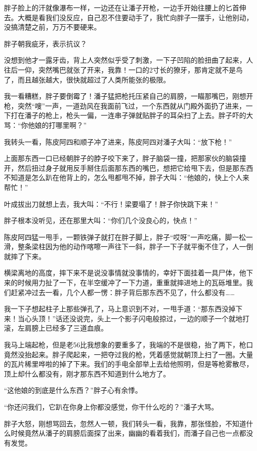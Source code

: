 胖子脸上的汗就像瀑布一样，一边还在让潘子开枪，一边手开始往腰上的匕首伸去。大概是看我们没反应，自己忍不住要动手了，我忙向胖子一摆手，让他别动，没搞清楚之前，万万不要硬来。

胖子朝我疵牙，表示抗议？

没想到他才一露牙齿，背上人突然似乎受了刺激，一下子凹陷的脸扭曲了起来，人往后一仰，突然嘴巴就张了开来，我靠！一口的2寸长的獠牙，那肯定就不是鸟了，而且越张越大，很快就超过了人类所能张的极限。

我一看糟糕，胖子要倒霉了！潘子猛把枪托压紧自己的肩膀，一瞄那嘴巴，刚想开枪，突然“嗖”一声，一道劲风在我面前飞过，一个东西就从门殿外面扔了进来，一下打在潘子的枪上，枪头一偏，一连串子弹就贴胖子的耳朵扫了上去。胖子吓的大骂：“你他娘的打哪里啊？”

我转头一看，陈皮阿四和顺子冲了进来，陈皮阿四对潘子大叫：“放下枪！”

上面那东西一口已经朝胖子的脖子咬下来了，胖子脑袋一撞，把那家伙的脑袋撞开，然后扭过身子就用反手掰住后面那东西的嘴巴，想把它给甩下去，但是那东西不知道是怎么趴在他背上的，怎么甩都甩不掉，胖子大叫：“他娘的，快上个人来帮忙！”

叶成拔出刀就想上去，我大叫：“不行！梁要塌了！胖子你快跳下来！”

胖子根本没听见，还在那里大叫：“你们几个没良心的，快点！”

陈皮阿四猛一甩手，一颗铁弹子就打在胖子脚上，胖子“哎呀”一声吃痛，脚一松一滑，整条梁柱因为他的动作喀嚓一声往下一斜，胖子一下子就平衡不住了，人一倒就摔了下来。

横梁离地的高度，摔下来不是说没事情就没事情的，幸好下面挂着一具尸体，他下来的时候用力扯了一下，在半空缓冲了一下力道，重重就摔进地上的瓦砾堆里。我们赶紧冲过去一看，几个人都一愣：胖子背后那东西不见了，什么都没有……

我一下子想起柱子上那些弹孔了，马上意识到不对，一甩手道：“那东西没掉下来！当心头顶！”话还没说完，头上一个影子闪电般掠过，一边的顺子一个就地打滚，左肩膀上已经多了三道血痕。

我马上端起枪，但是老56比我想象的要重多了，我端的不是很稳，抬了两下，枪口竟然没抬起来。胖子爬起来，一把夺过我的枪，凭着感觉就朝顶上扫了一圈。大量的瓦片稀里哗啦的掉了下来。我们的手电全部举上去给他照明，但是等枪雾散尽，顶上却什么都没有，刚才那东西不知道到什么地方了。

“这他娘的到底是什么东西？”胖子心有余悸。

“你还问我们，它趴在你身上你都没感觉，你干什么吃的？”潘子大骂。

胖子大怒，刚想骂回去，忽然人一顿，我们转头一看，我靠，那张怪脸，不知道什么时候竟然从潘子的肩膀后面探了出来，幽幽的看着我们，而潘子自己也一点都没有发觉。

